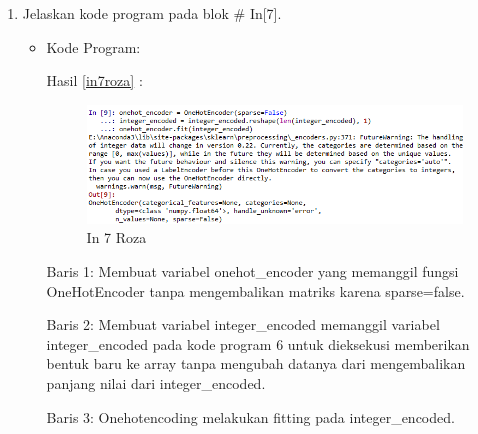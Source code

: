\begin{enumerate}
\item Jelaskan kode program pada blok \# In[7].
\begin{itemize}
\item Kode Program:

\par Hasil \ref{in7roza} :
\begin{figure}[!hbtp]
\centering
\includegraphics[scale=0.7]{figures/prak7roza.png}
\caption{In 7 Roza}
\label{in6roza}
\end{figure}
\par Baris 1: Membuat variabel onehot\_encoder yang memanggil fungsi OneHotEncoder tanpa mengembalikan matriks karena sparse=false.
\par Baris 2: Membuat variabel integer\_encoded memanggil variabel integer\_encoded pada kode program 6 untuk dieksekusi memberikan bentuk baru ke array tanpa mengubah datanya dari mengembalikan panjang nilai dari integer\_encoded.
\par Baris 3: Onehotencoding melakukan fitting pada integer\_encoded.
\end{itemize}
\par


\end{enumerate}
